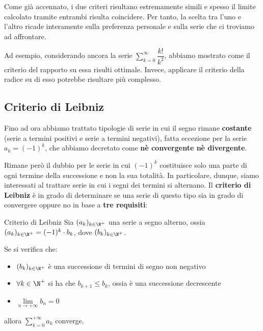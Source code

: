\documentclass[a4paper, 12pt]{report}
\begin{document}
{    }
    
    Come già accennato, i due criteri risultano estremamente simili e spesso il limite calcolato tramite entrambi risulta coincidere. Per tanto, la scelta tra l'uno e l'altro ricade interamente sulla preferenza personale e sulla serie che ci troviamo ad affrontare. 
    
    Ad esempio, considerando ancora la serie $\sum\limits_{k=0}^{\infty} \dfrac{k!}{k^2}$, abbiamo mostrato come il criterio del rapporto su essa risulti ottimale. Invece, applicare il criterio della radice su di esso potrebbe risultare più complesso.
    
    \newpage
    
    \subsection{Criterio di Leibniz}
    
    Fino ad ora abbiamo trattato tipologie di serie in cui il segno rimane \textbf{costante} (serie a termini positivi e serie a termini negativi), fatta eccezione per la serie $a_k = (-1)^k$, che abbiamo decretato come \textbf{nè convergente nè divergente}.
    
    Rimane però il dubbio per le serie in cui $(-1)^k$ costituisce solo una parte di ogni termine della successione e non la sua totalità. In particolare, dunque, siamo interessati al trattare serie in cui i segni dei termini si alternano. Il \textbf{criterio di Leibniz} è in grado di determinare se una serie di questo tipo sia in grado di convergere oppure no in base a \textbf{tre requisiti}:
    
    \begin{framedthm}{Criterio di Leibniz}
        Sia $(a_k)_{k \in \N^+}$ una serie a segno alterno, ossia $(a_k)_{k \in \N^+} = (-1)^k \cdot b_k$, dove $(b_k)_{k \in \N^+}$.
        
        Se si verifica che:
        \begin{itemize}
            \item $(b_k)_{k \in \N^+}$ è una successione di termini di segno non negativo
            \item $\forall k \in \N^+$ si ha che $b_{k+1} \leq b_k$, ossia è una successione decrescente
            \item $\lim\limits_{n \to +\infty} b_n = 0$
        \end{itemize}
        allora $\sum\limits_{k = 0}^{+\infty} a_k$ converge.
    \end{framedthm}
\end{document}
